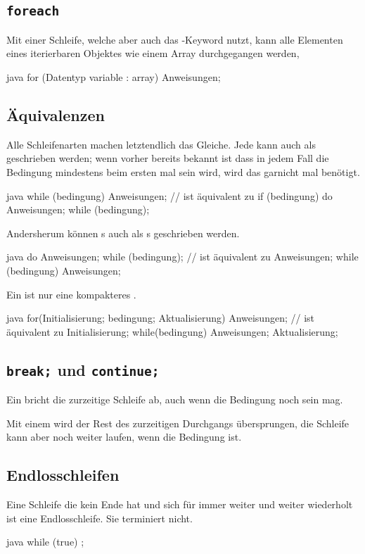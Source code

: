 \documentclass{article}
\begin{document}
\subsection{\texttt{foreach}}
Mit einer \sog {} Schleife, welche aber auch das -Keyword nutzt, kann alle Elementen eines iterierbaren Objektes wie einem Array durchgegangen werden,
\begin{sourcecode}{java}
for (Datentyp variable : array) {
    Anweisungen;
}
\end{sourcecode}

\subsection{Äquivalenzen}
Alle Schleifenarten machen letztendlich das Gleiche. Jede  kann auch als  geschrieben werden; wenn vorher bereits bekannt ist dass in jedem Fall die Bedingung mindestens beim ersten mal  sein wird, wird das  garnicht mal benötigt.
\begin{sourcecode}{java}
while (bedingung) {
    Anweisungen;
}
// ist äquivalent zu
if (bedingung) {
    do {
        Anweisungen;
    } while (bedingung);
}
\end{sourcecode}
Andersherum können s auch als s geschrieben werden. 
\begin{sourcecode}{java}
do {
    Anweisungen;
} while (bedingung);
// ist äquivalent zu
Anweisungen;
while (bedingung) {
    Anweisungen;
}
\end{sourcecode}
Ein  ist nur eine kompakteres .
\begin{sourcecode}{java}
for(Initialisierung; bedingung; Aktualisierung) {
    Anweisungen;
}
// ist äquivalent zu
{
    Initialisierung; 
    while(bedingung) {
        Anweisungen;
        Aktualisierung;
    }
}
\end{sourcecode}

\subsection{\texttt{break;} und \texttt{continue;}}
Ein  bricht die zurzeitige Schleife ab, auch wenn die Bedingung noch  sein mag.

Mit einem  wird der Rest des zurzeitigen Durchgangs übersprungen, die Schleife kann aber noch weiter laufen, wenn die Bedingung  ist.

\subsection{Endlosschleifen}
Eine Schleife die kein Ende hat und sich für immer weiter und weiter wiederholt ist eine Endlosschleife. Sie terminiert nicht.
\begin{sourcecode}{java}
while (true) {
   ;
}
\end{sourcecode}
\end{document}
